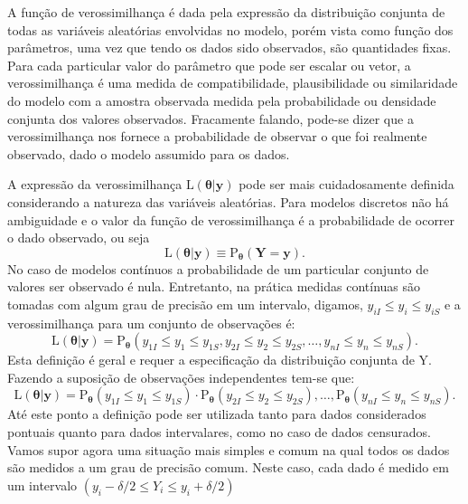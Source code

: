 \documentclass[
  9pt,
  a5paper,
]{book}
\theoremstyle{definition}
\theoremstyle{definition}
\theoremstyle{definition}
\theoremstyle{definition}
\theoremstyle{remark}
\begin{document}
A função de verossimilhança é dada pela expressão da distribuição conjunta de todas as variáveis aleatórias envolvidas no modelo, porém vista como função dos parâmetros, uma vez que tendo os dados sido observados, são quantidades fixas. Para cada particular valor do parâmetro que pode ser escalar ou vetor,
a verossimilhança é uma medida de compatibilidade, plausibilidade ou similaridade do modelo com a amostra observada medida pela probabilidade ou densidade conjunta dos valores observados. Fracamente falando, pode-se
dizer que a verossimilhança nos fornece a probabilidade de observar o que
foi realmente observado, dado o modelo assumido para os dados.

A expressão da verossimilhança \(\mathrm{L}(\boldsymbol{\theta}| \mathbf{y})\)
pode ser mais cuidadosamente definida considerando a natureza das variáveis aleatórias.
Para modelos discretos não há ambiguidade e o valor da função de verossimilhança é a probabilidade de ocorrer o dado observado, ou seja
\[
\mathrm{L}(\boldsymbol{\theta}|\mathbf{y}) \equiv \mathrm{P}_{\boldsymbol{\theta}}(\mathbf{Y}=\mathbf{y}). \]
No caso de modelos contínuos a probabilidade de um particular conjunto de
valores ser observado é nula. Entretanto, na prática medidas contínuas são tomadas com algum grau de precisão em um intervalo, digamos,
\(y_{iI} \leq y_i \leq y_{iS}\) e a verossimilhança para um conjunto de observações é:
\begin{equation}
\mathrm{L}(\boldsymbol{\theta}|\mathbf{y}) = \mathrm{P}_{\boldsymbol{\theta}}(y_{1I} \leq y_1 \leq y_{1S}, y_{2I} \leq y_2 \leq y_{2S}, 
\ldots, y_{nI} \leq y_n \leq y_{nS}).
\label{eq:verogeral}
\end{equation}
Esta definição é geral e requer a especificação da distribuição conjunta
de \(\mathrm{Y}\). Fazendo a suposição de observações independentes tem-se que:
\begin{equation}\label{eq:veroind}
\mathrm{L}(\boldsymbol{\theta}|\mathbf{y}) = \mathrm{P}_{\boldsymbol{\theta} }(y_{1I} \leq y_1 \leq y_{1S}) \cdot \mathrm{P}_{\boldsymbol{\theta}}(y_{2I} \leq y_2 \leq y_{2S}), \ldots ,
\mathrm{P}_{\boldsymbol{\theta}}(y_{nI} \leq y_n \leq y_{nS}).
\end{equation}
Até este ponto a definição pode ser utilizada tanto para dados considerados
pontuais quanto para dados intervalares, como no caso de dados censurados.
Vamos supor agora uma situação mais simples e comum na qual todos os dados
são medidos a um grau de precisão comum.
Neste caso, cada dado é medido em um intervalo
\((y_i - \delta/2 \leq Y_i \leq y_i + \delta/2)\)
\end{document}
